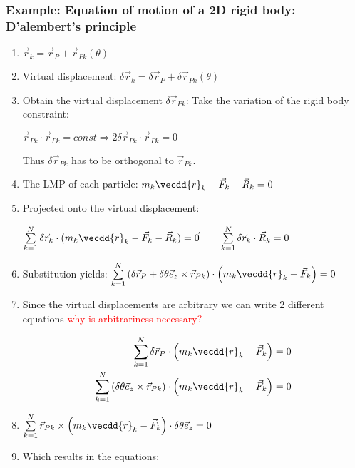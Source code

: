 \documentclass[10pt,a4paper]{scrartcl}
\begin{document}
\begin{multicols*}{2}

\subsubsection{Example: Equation of motion of a 2D rigid body: D'alembert's principle}


\begin{enumerate}
\item $\vec{r}_k = \vec{r}_P+\vec{r}_{Pk}(\theta)$
\item Virtual displacement: $\delta\vec{r}_k =\delta\vec{r}_P+\delta\vec{r}_{Pk}(\theta)$
\item Obtain the virtual displacement $\delta \vec{r}_{Pk}$: Take the variation of the rigid body constraint:

$\vec{r}_{Pk}\cdot\vec{r}_{Pk}=const\Rightarrow 2\delta\vec{r}_{Pk}\cdot\vec{r}_{Pk}=0$

Thus $\delta\vec{r}_{Pk}$ has to be orthogonal to $\vec{r}_{Pk}$.
\item The LMP of each particle: $m_k\vecdd{r}_k-\vec{F}_k-\vec{R}_k = 0$
\item Projected onto the virtual displacement: 

$\sum\limits_{k=1}^N\delta\vec{r}_k\cdot(m_k\vecdd{r}_k-\vec{F}_k-\vec{R}_k)=\vec{0}\qquad \sum\limits_{k=1}^N\delta\vec{r}_k\cdot\vec{R}_k = 0$
\item Substitution yields: $\sum\limits_{k=1}^N\left(\delta\vec{r}_P+\delta\theta\vec{e}_z\times\vec{r}_{Pk}\right)\cdot\left(m_k\vecdd{r}_k-\vec{F}_k\right)=0$
\item Since the virtual displacements are arbitrary we can write 2 different equations \textcolor{red}{why is arbitrariness necessary?}

\begin{align*}
\sum\limits_{k=1}^N\delta\vec{r}_P\cdot\left(m_k\vecdd{r}_k-\vec{F}_k\right)&=0\\
\sum\limits_{k=1}^N\left(\delta\theta\vec{e}_z\times\vec{r}_{Pk}\right)\cdot\left(m_k\vecdd{r}_k-\vec{F}_k\right)&=0
\end{align*}


\item
$\sum\limits_{k=1}^N\vec{r}_{Pk}\times\left(m_k\vecdd{r}_k-\vec{F}_k\right)\cdot\delta\theta\vec{e}_z=0$
\item Which results in the equations:


\end{enumerate}
\end{multicols*}
\end{document}
